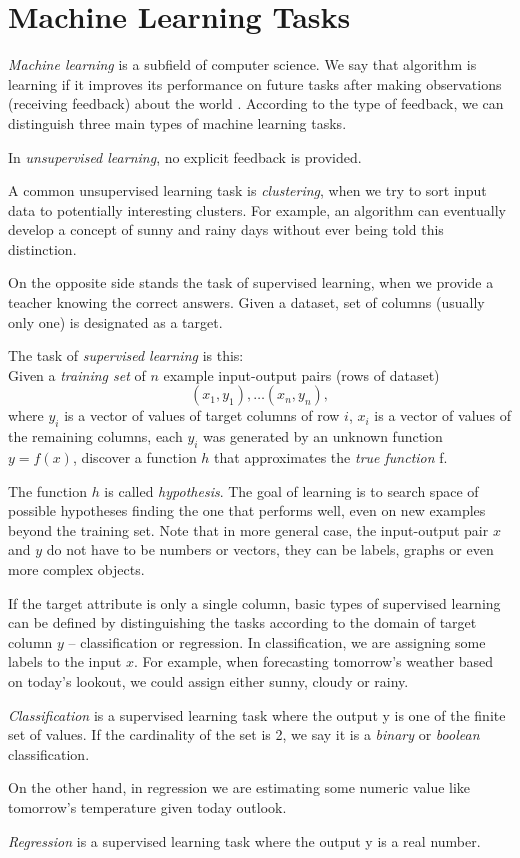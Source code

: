 \section{Machine Learning Tasks}
\label{section:mlTasks}
\emph{Machine learning} is a subfield of computer science. We say that algorithm is learning if it improves its performance on future tasks after making observations (receiving feedback) about the world \cite{aima3ed}.
According to the type of feedback, we can distinguish three main types of machine learning tasks.
\begin{definition}
	In \emph{unsupervised learning}, no explicit feedback is provided.
\end{definition}
A common unsupervised learning task is \emph{clustering}, when we try to sort input data to potentially interesting clusters. For example, an algorithm can eventually develop a concept of sunny and rainy days without ever being told this distinction.

On the opposite side stands the task of supervised learning, when we provide a teacher knowing the correct answers. Given a dataset, set of columns (usually only one) is designated as a target. 
\begin{definition}
	The task of \emph{supervised learning} is this: \\
	Given a \emph{training set} of $n$ example input-output pairs (rows of dataset)
	\begin{equation*}
	(x_1,y_1),\dots (x_n,y_n),
	\end{equation*}
	where $y_i$ is a vector of values of target columns of row $i$, $x_i$ is a vector of values of the remaining columns, each $y_i$ was generated by an unknown function $y=f(x)$, 
	discover a function $h$ that approximates the \emph{true function} f.
\end{definition}
 The function $h$ is called \emph{hypothesis}. The goal of learning is to search space of possible hypotheses finding the one that performs well, even on new examples beyond the training set. Note that in more general case, the input-output pair $x$ and $y$ do not have to be numbers or vectors, they can be labels, graphs or even more complex objects.

If the target attribute is only a single column, basic types of supervised learning can be defined by distinguishing the tasks according to the domain of target column $y$ -- classification or regression. 
In classification, we are assigning some labels to the input $x$. For example, when forecasting tomorrow's weather based on today's lookout, we could assign either sunny, cloudy or rainy.
\begin{definition}
	\emph{Classification} is a supervised learning task where the output y is one of the finite set of values. If the cardinality of the set is 2, we say it is a \emph{binary} or \emph{boolean} classification.
\end{definition}
On the other hand, in regression we are estimating some numeric value like tomorrow's temperature given today outlook.
\begin{definition}
	\emph{Regression} is a supervised learning task where the output y is a real number.
\end{definition}

